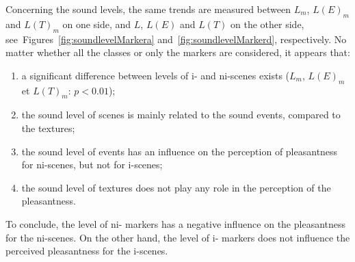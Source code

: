 \documentclass[12pt]{elsarticle}
\newcommand{\cf}{cf.}
\begin{document}
Concerning the sound levels, the same trends are measured between $L_m$, $L(E)_m$ and $L(T)_m$ on one side, and $L$, $L(E)$ and $L(T)$ on the other side, see~Figures~\ref{fig:soundlevelMarkera} and~\ref{fig:soundlevelMarkerd}, respectively. No matter whether all the classes or only the markers are considered, it appears that:


\begin{enumerate}
\item a significant difference between levels of i- and ni-scenes exists ($L_m$, $L(E)_m$ et $L(T)_m$: $p<0.01$);
\item the sound level of scenes is mainly related to the sound events, compared to the textures;
\item the sound level of events has an influence on the perception of pleasantness for ni-scenes, but not for i-scenes;
\item the sound level of textures does not play any role in the perception of the pleasantness.
\end{enumerate}


To conclude, the level of ni- markers has a negative influence on the pleasantness for the ni-scenes. On the other hand, the level of i- markers does not influence the perceived pleasantness for the i-scenes.

\end{document}
